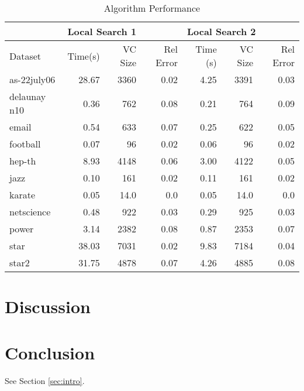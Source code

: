 \documentclass[sigconf]{acmart}
\begin{document}
\begin{table}[h]
	\centering
	\caption{Algorithm Performance}
	\label{algperf}
	\begin{tabular}{lrrrrrr}
		\hline
		& \multicolumn{3}{l}{Local Search 1} & \multicolumn{3}{l}{Local Search 2} \\ \hline
		Dataset & Time(s)    & VC Size   & Rel Error  & Time (s)   & VC Size   & Rel Error  \\ \hline
		as-22july06    & 28.67   & 3360      & 0.02   & 4.25   & 3391      & 0.03   \\
		delaunay n10    & 0.36   & 762      & 0.08   & 0.21   & 764      & 0.09   \\
		email    & 0.54   & 633      & 0.07   & 0.25   & 622      & 0.05   \\
		football    & 0.07   & 96      & 0.02   & 0.06   & 96      & 0.02   \\
		hep-th    & 8.93   & 4148      & 0.06   & 3.00   & 4122      & 0.05   \\
		jazz    & 0.10   & 161      & 0.02   & 0.11   & 161      & 0.02   \\
		karate    & 0.05   & 14.0      & 0.0   & 0.05   & 14.0      & 0.0   \\
		netscience    & 0.48   & 922      & 0.03   & 0.29   & 925      & 0.03   \\
		power    & 3.14   & 2382      & 0.08   & 0.87   & 2353      & 0.07   \\
		star    & 38.03   & 7031      & 0.02   & 9.83   & 7184      & 0.04   \\
		star2    & 31.75   & 4878      & 0.07   & 4.26   & 4885      & 0.08   \\
	\end{tabular}
\end{table}

\section{Discussion}

\section{Conclusion}
See Section \ref{sec:intro}.


 
\end{document}
